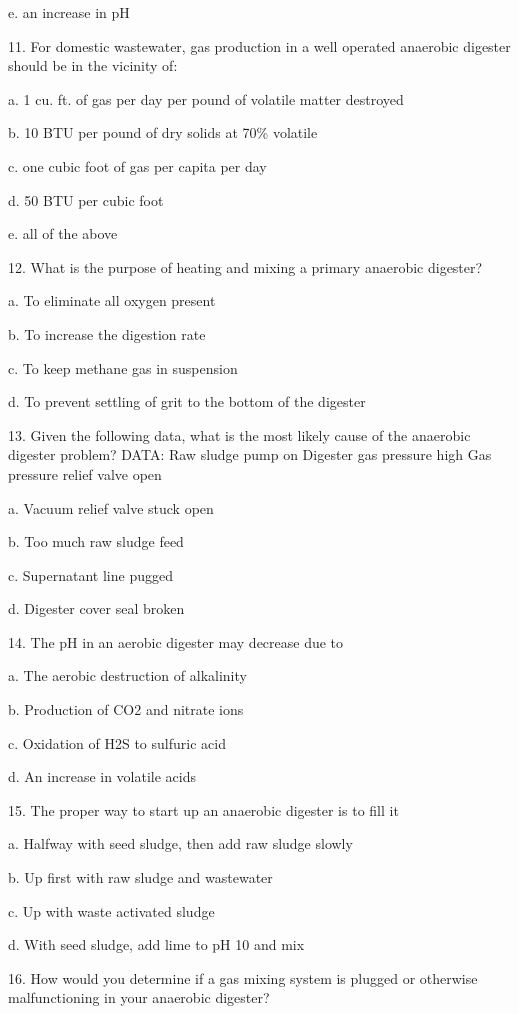 \documentclass{article}
\begin{document}
e. an increase in pH 


11. For domestic wastewater, gas production in a well operated anaerobic digester should be in the vicinity of: 

a. 1 cu. ft. of gas per day per pound of volatile matter destroyed 

b. 10 BTU per pound of dry solids at 70\% volatile 

c. one cubic foot of gas per capita per day 

d. 50 BTU per cubic foot 

e. all of the above 


12. What is the purpose of heating and mixing a primary anaerobic digester? 

a. To eliminate all oxygen present 

b. To increase the digestion rate 

c. To keep methane gas in suspension 

d. To prevent settling of grit to the bottom of the digester 


13. Given the following data, what is the most likely cause of the anaerobic digester problem?
DATA:    Raw sludge pump on
                Digester gas pressure high
                Gas pressure relief valve open 

a. Vacuum relief valve stuck open 

b. Too much raw sludge feed 

c. Supernatant line pugged 

d. Digester cover seal broken 


14. The pH in an aerobic digester may decrease due to 

a. The aerobic destruction of alkalinity 

b. Production of CO2 and nitrate ions 

c. Oxidation of H2S to sulfuric acid 

d. An increase in volatile acids 


15. The proper way to start up an anaerobic digester is to fill it 

a. Halfway with seed sludge, then add raw sludge slowly 

b. Up first with raw sludge and wastewater 

c. Up with waste activated sludge 

d. With seed sludge, add lime to pH 10 and mix 


16. How would you determine if a gas mixing system is plugged or otherwise malfunctioning in your anaerobic digester? 
\end{document}

